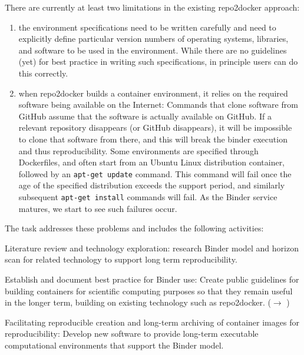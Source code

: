 \begin{task}[
  title=Archiving software environments for reproducible computation,
  id=reproducibility,
  lead=XFEL,
  PM=42,
  wphases={0-36},
  partners={EGI,QS,SRL,UPSUD,WTT}
]
  There are currently at least two limitations in the existing
  repo2docker approach:
\begin{enumerate}
\item the environment specifications need to be written carefully and
  need to explicitly define particular version numbers of operating
  systems, libraries, and software to be used in the
  environment. While there are no guidelines (yet) for best practice
  in writing such specifications, in principle users can do this
  correctly.
\item when repo2docker builds a container environment, it relies on
  the required software being available on the Internet: Commands that
  clone software from GitHub assume that the software is actually
  available on GitHub. If a relevant repository disappears (or GitHub
  disappears), it will be impossible to clone that software from
  there, and this will break the binder execution and thus
  reproducibility. Some environments are specified through
  Dockerfiles, and often start from an Ubuntu Linux distribution
  container, followed by an \texttt{apt-get update} command. This
  command will fail once the age of the specified distribution exceeds
  the support period, and similarly subsequent \texttt{apt-get
    install} commands will fail. As the Binder service matures, we
  start to see such failures occur.
\end{enumerate}

The task addresses these problems and includes the following activities:
\begin{compactitem}

\item Literature review and technology exploration: research Binder
  model and horizon scan for related technology to support long term
  reproducibility.

\item Establish and document best practice for Binder use: Create
  public guidelines for building containers for scientific computing
  purposes so that they remain useful in the longer term, building on
  existing technology such as repo2docker. ($\rightarrow$
  )

\item Facilitating reproducible creation and long-term archiving of
  container images for reproducibility: Develop new software to
  provide long-term executable computational environments that support
  the Binder model.


\end{compactitem}
\end{task}
